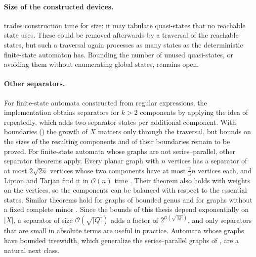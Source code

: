 \paragraph{Size of the constructed devices.}
 trades construction time for size: it may tabulate
quasi-states that no reachable state uses. These could be removed afterwards by a
traversal of the reachable states, but such a traversal again processes as many states as
the deterministic finite-state automaton has. Bounding the number of unused quasi-states,
or avoiding them without enumerating global states, remains open.

\paragraph{Other separators.}
For finite-state automata constructed from regular expressions, the implementation
obtains separators for $k > 2$ components by applying the idea of
 repeatedly, which adds two separator states per additional
component. With boundaries () the growth of
$X$ matters only through the traversal, but bounds on the sizes of the resulting components
and of their boundaries remain to be proved. For finite-state automata whose graphs are not series--parallel, other separator theorems
apply. Every planar graph with $n$ vertices has a separator of at most $2 \sqrt{2n}$
vertices whose two components have at most $\frac{2}{3} n$ vertices each, and Lipton and
Tarjan find it in $\mathcal{O}(n)$ time \cite{lipton_tarjan_theorem}. Their theorem also
holds with weights on the vertices, so the components can be balanced with respect to the
essential states. Similar theorems hold for graphs of bounded genus
\cite{gilbert_hutchinson_tarjan} and for graphs without a fixed complete minor
\cite{alon_seymour_thomas}. Since the bounds of this thesis depend exponentially on $|X|$,
a separator of size $\mathcal{O}(\sqrt{|Q|})$ adds a factor of $2^{\mathcal{O}(\sqrt{|Q|})}$,
and only separators that are small in absolute terms are useful in practice. Automata whose
graphs have bounded treewidth, which generalize the series--parallel graphs of
, are a natural next class.
